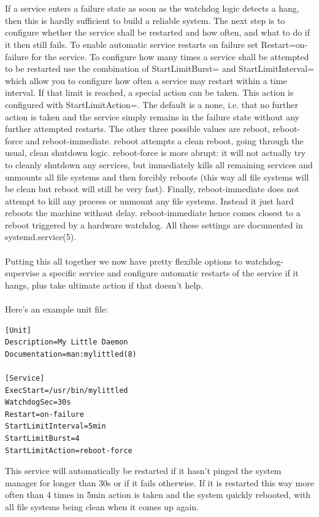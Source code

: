 \documentclass[titlepage]{article}
\begin{document}
\\
\\
If a service enters a failure state as soon as the watchdog logic detects a hang, then this is hardly sufficient to build a reliable system. The next step is to configure whether the service shall be restarted and how often, and what to do if it then still fails. To enable automatic service restarts on failure set Restart=on-failure for the service. To configure how many times a service shall be attempted to be restarted use the combination of StartLimitBurst= and StartLimitInterval= which allow you to configure how often a service may restart within a time interval. If that limit is reached, a special action can be taken. This action is configured with StartLimitAction=. The default is a none, i.e. that no further action is taken and the service simply remains in the failure state without any further attempted restarts. The other three possible values are reboot, reboot-force and reboot-immediate. reboot attempts a clean reboot, going through the usual, clean shutdown logic. reboot-force is more abrupt: it will not actually try to cleanly shutdown any services, but immediately kills all remaining services and unmounts all file systems and then forcibly reboots (this way all file systems will be clean but reboot will still be very fast). Finally, reboot-immediate does not attempt to kill any process or unmount any file systems. Instead it just hard reboots the machine without delay. reboot-immediate hence comes closest to a reboot triggered by a hardware watchdog. All these settings are documented in systemd.service(5).
\\
\\
Putting this all together we now have pretty flexible options to watchdog-supervise a specific service and configure automatic restarts of the service if it hangs, plus take ultimate action if that doesn't help.
\\
\\
Here's an example unit file:
\begin{lstlisting}
[Unit]
Description=My Little Daemon
Documentation=man:mylittled(8)

[Service]
ExecStart=/usr/bin/mylittled
WatchdogSec=30s
Restart=on-failure
StartLimitInterval=5min
StartLimitBurst=4
StartLimitAction=reboot-force
\end{lstlisting}
This service will automatically be restarted if it hasn't pinged the system manager for longer than 30s or if it fails otherwise. If it is restarted this way more often than 4 times in 5min action is taken and the system quickly rebooted, with all file systems being clean when it comes up again.
\end{document}

